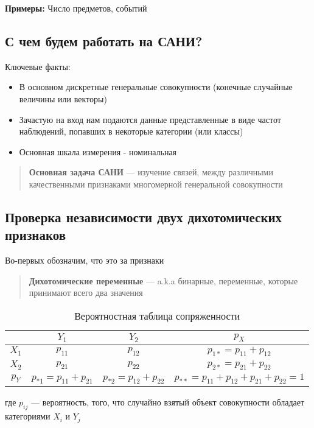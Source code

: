 \documentclass{article}
\begin{document}
    \textbf{Примеры: } Число предметов, событий

    \subsection{С чем будем работать на САНИ?}

    Ключевые факты:

    \begin{itemize}
        \item В основном дискретные генеральные совокупности (конечные случайные величины или векторы)
        \item Зачастую на вход нам подаются данные представленные в виде частот наблюдений, попавших в некоторые категории (или классы)
        \item Основная шкала измерения - номинальная
    \end{itemize}

    \begin{quote}
        \textbf{Основная задача САНИ} --- изучение связей, между различными качественными признаками многомерной генеральной совокупности
    \end{quote}

    \subsection{Проверка независимости двух дихотомических признаков}

    Во-первых обозначим, что это за признаки

    \begin{quote}
        \textbf{Дихотомические переменные} --- a.k.a бинарные, переменные, которые принимают всего два значения
    \end{quote}


    \begin{table}[h!]
    \centering
    \begin{tabular}{|c|c|c|c|}
      \hline
      & $Y_{1}$ & $Y_{2}$ & $p_{X}$ \\ \hline
      $X_{1}$ & $p_{11}$ & $p_{12}$ & $p_{1*} = p_{11} + p_{12}$  \\ \hline
      $X_{2}$ & $p_{21}$ & $p_{22}$ & $p_{2*} = p_{21} + p_{22}$ \\ \hline
      \textbf{$p_{Y}$} & $p_{*1} = p_{11} + p_{21}$ & $p_{*2} = p_{12} + p_{22}$ & $p_{**} = p_{11} + p_{12} + p_{21} + p_{22} = 1$ \\ \hline
    \end{tabular}
    \caption{Вероятностная таблица сопряженности}
    \label{tab:prob}
    \end{table}
    где $p_{ij}$ --- вероятность, того, что случайно взятый объект совокупности обладает категориями $X_{i}$ и $Y_{j}$
\end{document}
